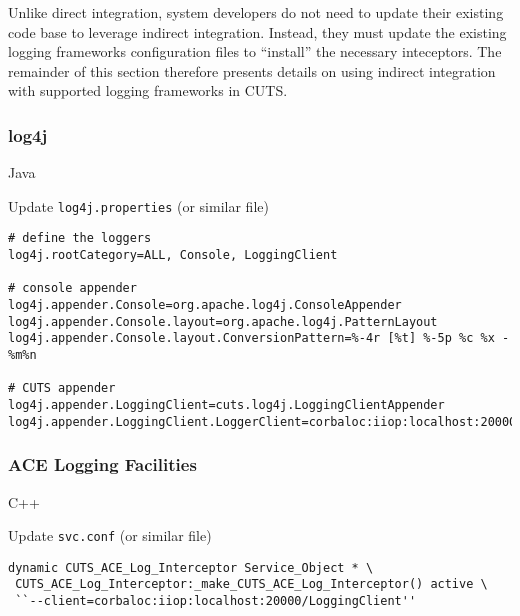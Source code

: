 Unlike direct integration, system developers do not need to update
their existing code base to leverage indirect integration. Instead,
they must update the existing logging frameworks configuration files 
to ``install'' the necessary inteceptors. The remainder of this section
therefore presents details on using indirect integration with supported
logging frameworks in CUTS.

\subsubsection{log4j}

 Java

 Update \texttt{log4j.properties} (or similar file)


\begin{lstlisting}[basicstyle=\footnotesize]
# define the loggers
log4j.rootCategory=ALL, Console, LoggingClient

# console appender
log4j.appender.Console=org.apache.log4j.ConsoleAppender
log4j.appender.Console.layout=org.apache.log4j.PatternLayout
log4j.appender.Console.layout.ConversionPattern=%-4r [%t] %-5p %c %x - %m%n

# CUTS appender
log4j.appender.LoggingClient=cuts.log4j.LoggingClientAppender
log4j.appender.LoggingClient.LoggerClient=corbaloc:iiop:localhost:20000/LoggingClient
\end{lstlisting}

\subsubsection{ACE Logging Facilities}

 C++

 Update \texttt{svc.conf} (or similar file)

\begin{lstlisting}
dynamic CUTS_ACE_Log_Interceptor Service_Object * \
 CUTS_ACE_Log_Interceptor:_make_CUTS_ACE_Log_Interceptor() active \
 ``--client=corbaloc:iiop:localhost:20000/LoggingClient''
\end{lstlisting}
